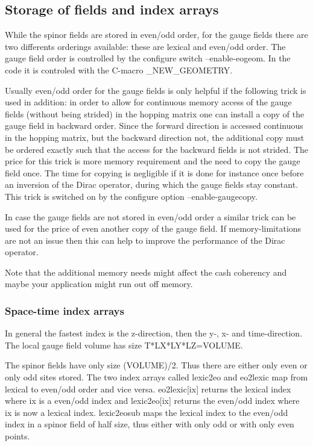 \subsection{Storage of fields and index arrays}
\label{subsec:storage}

While the spinor fields are stored in even/odd order, for the gauge
fields there are two differents orderings available: these are
lexical and even/odd order. The gauge field order is controlled
by the configure switch {\ttfamily --enable-eogeom}. In the code it is
controled with the C-macro {\ttfamily \_NEW\_GEOMETRY}.

Usually even/odd order for the gauge fields is only helpful if the
following trick is used in addition: in order to allow for continuous
memory access of the gauge fields (without being strided) in the
hopping matrix one can install a copy of the gauge field in backward
order. Since the forward direction is accessed continuous in the
hopping matrix, but the backward direction not, the additional copy
must be ordered exactly such that the access for the backward fields
is not strided. The price for this trick is more memory requirement
and the need to copy the gauge field once. The time for copying is
negligible if it is done for instance once before an inversion of the
Dirac operator, during which the gauge fields stay constant. This
trick is switched on by the configure option {\ttfamily
  --enable-gaugecopy}.

In case the gauge fields are not stored in even/odd order a similar
trick can be used for the price of even another copy of the gauge
field. If memory-limitations are not an issue then this can help to
improve the performance of the Dirac operator.

Note that the additional memory needs might affect the cash coherency
and maybe your application might run out off memory.

\subsubsection{Space-time index arrays}

In general the fastest index is the z-direction, then the y-, x- and
time-direction. The local gauge field volume has size
{\ttfamily T*LX*LY*LZ=VOLUME}. 

The spinor fields have only size {\ttfamily (VOLUME)/2}. Thus
there are either only even or only odd sites stored. The two
index arrays called {\ttfamily lexic2eo} and {\ttfamily eo2lexic} map
from lexical to even/odd order and vice versa. {\ttfamily
  eo2lexic[ix]} returns the lexical index where {\ttfamily ix} is a
even/odd index and {\ttfamily lexic2eo[ix]} returns the even/odd index
where {\ttfamily ix} is now a lexical index. {\ttfamily lexic2eosub}
maps the lexical index to the even/odd index in a spinor field of half
size, thus either with only odd or with only even points.

